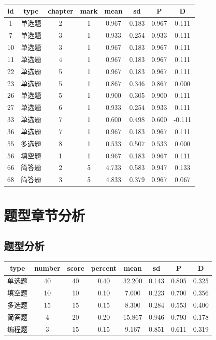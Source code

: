\documentclass[hyperref,adobefonts]{ctexart}
\begin{document}
\begin{longtable}{c|c|c|c|c|c|c|c}
\hline
id & type & chapter & mark & mean & sd & P & D\\
\hline
1 & 单选题 & 2 & 1 & 0.967 & 0.183 & 0.967 & 0.111\\
\hline
7 & 单选题 & 3 & 1 & 0.933 & 0.254 & 0.933 & 0.111\\
\hline
10 & 单选题 & 3 & 1 & 0.967 & 0.183 & 0.967 & 0.111\\
\hline
11 & 单选题 & 4 & 1 & 0.967 & 0.183 & 0.967 & 0.111\\
\hline
22 & 单选题 & 5 & 1 & 0.967 & 0.183 & 0.967 & 0.111\\
\hline
23 & 单选题 & 5 & 1 & 0.867 & 0.346 & 0.867 & 0.000\\
\hline
26 & 单选题 & 5 & 1 & 0.900 & 0.305 & 0.900 & 0.111\\
\hline
27 & 单选题 & 6 & 1 & 0.933 & 0.254 & 0.933 & 0.111\\
\hline
33 & 单选题 & 7 & 1 & 0.600 & 0.498 & 0.600 & -0.111\\
\hline
36 & 单选题 & 7 & 1 & 0.967 & 0.183 & 0.967 & 0.111\\
\hline
55 & 多选题 & 8 & 1 & 0.533 & 0.507 & 0.533 & 0.000\\
\hline
56 & 填空题 & 1 & 1 & 0.967 & 0.183 & 0.967 & 0.111\\
\hline
66 & 简答题 & 2 & 5 & 4.733 & 0.583 & 0.947 & 0.133\\
\hline
68 & 简答题 & 3 & 5 & 4.833 & 0.379 & 0.967 & 0.067\\
\hline
\end{longtable}

\section{题型章节分析}

\subsection{题型分析}

\begin{longtable}{c|c|c|c|c|c|c|c}
\hline
type & number & score & percent & mean & sd & P & D\\
\hline
单选题 & 40 & 40 & 0.40 & 32.200 & 0.143 & 0.805 & 0.325\\
\hline
填空题 & 10 & 10 & 0.10 & 7.000 & 0.223 & 0.700 & 0.356\\
\hline
多选题 & 15 & 15 & 0.15 & 8.300 & 0.284 & 0.553 & 0.400\\
\hline
简答题 & 4 & 20 & 0.20 & 15.867 & 0.946 & 0.793 & 0.178\\
\hline
编程题 & 3 & 15 & 0.15 & 9.167 & 0.851 & 0.611 & 0.319\\
\hline
\end{longtable}
\end{document}
